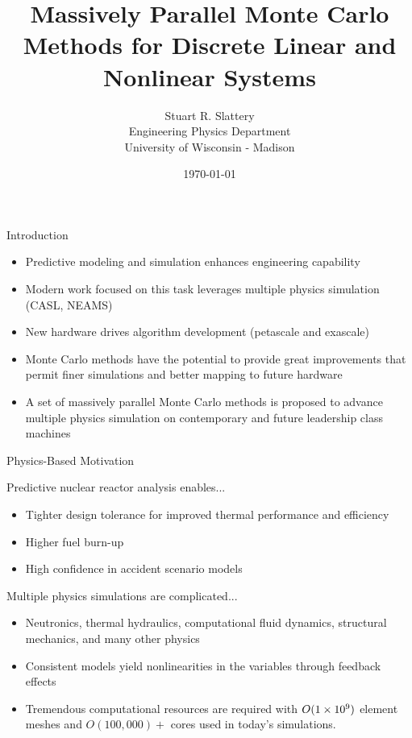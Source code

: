 \documentclass{beamer}
\author{Stuart R. Slattery
  \\ Engineering Physics Department
  \\ University of Wisconsin - Madison
}
\date{\today}
\title{Massively Parallel Monte Carlo Methods for Discrete Linear and
  Nonlinear Systems}
\begin{document}
\maketitle

\begin{frame}{Introduction}

  \begin{itemize}
  \item Predictive modeling and simulation enhances engineering
    capability
  \item Modern work focused on this task leverages multiple physics
    simulation (CASL, NEAMS)
  \item New hardware drives algorithm development (petascale and
    exascale)
  \item Monte Carlo methods have the potential to provide great
    improvements that permit finer simulations and better mapping to
    future hardware
  \item A set of massively parallel Monte Carlo methods is proposed to
    advance multiple physics simulation on contemporary and future
    leadership class machines
  \end{itemize}

\end{frame}

\begin{frame}{Physics-Based Motivation}
  
  \begin{beamerboxesrounded}[upper=boxheadcolor,lower=boxbodycolor,shadow=true]
    {Predictive nuclear reactor analysis enables...}
    \begin{itemize}
    \item Tighter design tolerance for improved thermal performance
      and efficiency
    \item Higher fuel burn-up
    \item High confidence in accident scenario models
    \end{itemize}
  \end{beamerboxesrounded}

  \begin{beamerboxesrounded}[upper=boxheadcolor,lower=boxbodycolor,shadow=true]
    {Multiple physics simulations are complicated...}
    \begin{itemize}
    \item Neutronics, thermal hydraulics, computational fluid
      dynamics, structural mechanics, and many other physics
    \item Consistent models yield nonlinearities in the variables
      through feedback effects
    \item Tremendous computational resources are required with
      $O(1\times 10^{9})$ element meshes and $O(100,000)+$ cores used in
      today's simulations.
    \end{itemize}
  \end{beamerboxesrounded}

\end{frame}
\end{document}
